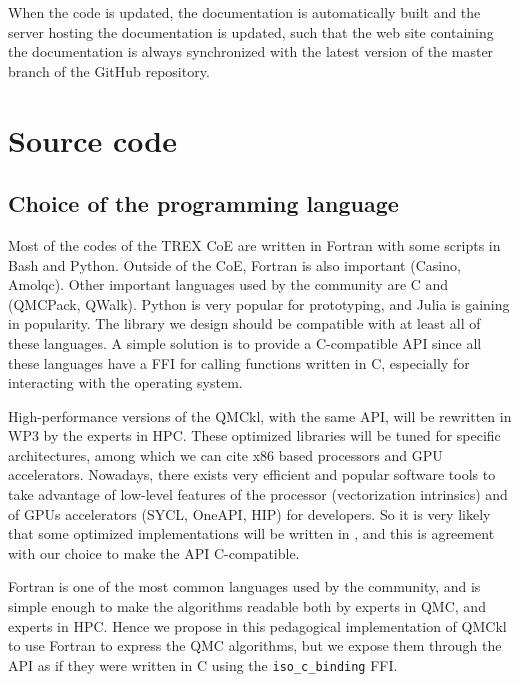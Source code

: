 When the code is updated, the documentation is automatically built and
the server hosting the documentation is updated, such that the web
site containing the documentation is always synchronized with the
latest version of the master branch of the GitHub repository.


\section{Source code}

\subsection{Choice of the programming language}

Most of the codes of the \ac{TREX} \ac{CoE} are written in Fortran
with some scripts in Bash and Python. Outside of the
\ac{CoE}, Fortran is also important (Casino, Amolqc). Other
important languages used by the community are C and {\CC} (QMCPack,
QWalk). Python is very popular for prototyping, and Julia is gaining
in popularity\cite{poole_2020}. The library we design should be
compatible with at least all of these languages. A simple solution is
to provide a C-compatible \ac{API} since all these languages have a
\ac{FFI} for calling functions written in C, especially for
interacting with the operating system.

High-performance versions of the \ac{QMCkl}, with the same \ac{API},
will be rewritten in \ac{WP}3 by the experts in \ac{HPC}. These
optimized libraries will be tuned for specific architectures, among
which we can cite x86 based processors and \ac{GPU} accelerators.
Nowadays, there exists very efficient and popular software tools to
take advantage of low-level features of the processor\cite{pohl_2016}
(vectorization intrinsics) and of \acp{GPU} accelerators (SYCL\cite{SYCL},
OneAPI, HIP) for {\CC} developers. So it is very likely
that some optimized implementations will be written in {\CC}, and this
is agreement with our choice to make the \ac{API} C-compatible.

Fortran is one of the most common languages used by the community, and
is simple enough to make the algorithms readable both by experts in
\ac{QMC}, and experts in \ac{HPC}. Hence we propose in this
pedagogical implementation of \ac{QMCkl} to use Fortran to express the
QMC algorithms, but we expose them through the \ac{API} as if they
were written in C using the \texttt{iso_c_binding} \ac{FFI}.

